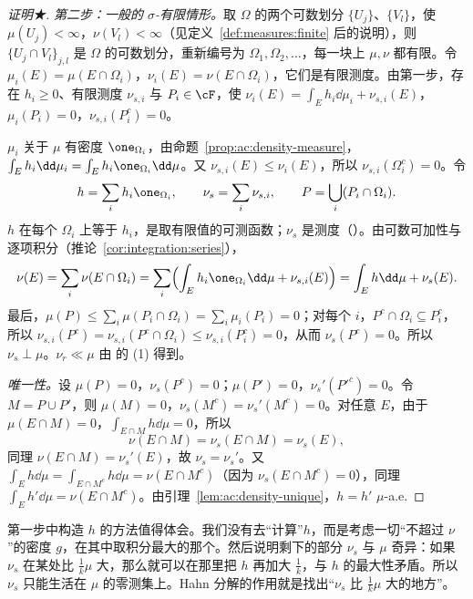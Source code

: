 \begin{proof}[证明★]
\emph{第二步：一般的 $\sigma$-有限情形。}取 $\Omega$ 的两个可数划分 $\{U_j\}$、$\{V_l\}$，使 $\mu(U_j)<\infty$，$\nu(V_l)<\infty$（见定义~\ref{def:measures:finite} 后的说明），则 $\{U_j\cap V_l\}_{j,l}$ 是 $\Omega$ 的可数划分，重新编号为 $\Omega_1,\Omega_2,\dots$，每一块上 $\mu,\nu$ 都有限。令 $\mu_i(E)=\mu(E\cap\Omega_i)$，$\nu_i(E)=\nu(E\cap\Omega_i)$，它们是有限测度。由第一步，存在 $h_i\geqslant0$、有限测度 $\nu_{s,i}$ 与 $P_i\in\cF$，使 $\nu_i(E)=\int_Eh_i\dd\mu_i+\nu_{s,i}(E)$，$\mu_i(P_i)=0$，$\nu_{s,i}(P_i^c)=0$。

$\mu_i$ 关于 $\mu$ 有密度 $\one_{\Omega_i}$，由命题~\ref{prop:ac:density-measure}，$\int_Eh_i\dd\mu_i=\int_Eh_i\one_{\Omega_i}\dd\mu$。又 $\nu_{s,i}(E)\leqslant\nu_i(E)$，所以 $\nu_{s,i}(\Omega_i^c)=0$。令
\[
h=\sum_ih_i\one_{\Omega_i},\qquad\nu_s=\sum_i\nu_{s,i},\qquad P=\bigcup_i(P_i\cap\Omega_i).
\]
$h$ 在每个 $\Omega_i$ 上等于 $h_i$，是取有限值的可测函数；$\nu_s$ 是测度（）。由可数可加性与逐项积分（推论~\ref{cor:integration:series}），
\[
\nu(E)=\sum_i\nu(E\cap\Omega_i)=\sum_i\Bigl(\int_Eh_i\one_{\Omega_i}\dd\mu+\nu_{s,i}(E)\Bigr)=\int_Eh\dd\mu+\nu_s(E).
\]
最后，$\mu(P)\leqslant\sum_i\mu(P_i\cap\Omega_i)=\sum_i\mu_i(P_i)=0$；对每个 $i$，$P^c\cap\Omega_i\subseteq P_i^c$，所以 $\nu_{s,i}(P^c)=\nu_{s,i}(P^c\cap\Omega_i)\leqslant\nu_{s,i}(P_i^c)=0$，从而 $\nu_s(P^c)=0$。所以 $\nu_s\perp\mu$。$\nu_r\ll\mu$ 由 的 (1) 得到。

\emph{唯一性。}设 $\mu(P)=0$，$\nu_s(P^c)=0$；$\mu(P')=0$，$\nu_s'(P'^c)=0$。令 $M=P\cup P'$，则 $\mu(M)=0$，$\nu_s(M^c)=\nu_s'(M^c)=0$。对任意 $E$，由于 $\mu(E\cap M)=0$，$\int_{E\cap M}h\dd\mu=0$，所以
\[
\nu(E\cap M)=\nu_s(E\cap M)=\nu_s(E),
\]
同理 $\nu(E\cap M)=\nu_s'(E)$，故 $\nu_s=\nu_s'$。又 $\int_Eh\dd\mu=\int_{E\cap M^c}h\dd\mu=\nu(E\cap M^c)$（因为 $\nu_s(E\cap M^c)=0$），同理 $\int_Eh'\dd\mu=\nu(E\cap M^c)$。由引理~\ref{lem:ac:density-unique}，$h=h'$ $\mu$-a.e.
\end{proof}

\begin{remark}
第一步中构造 $h$ 的方法值得体会。我们没有去“计算”$h$，而是考虑一切“不超过 $\nu$”的密度 $g$，在其中取积分最大的那个。然后说明剩下的部分 $\nu_s$ 与 $\mu$ 奇异：如果 $\nu_s$ 在某处比 $\frac1k\mu$ 大，那么就可以在那里把 $h$ 再加大 $\frac1k$，与 $h$ 的最大性矛盾。所以 $\nu_s$ 只能生活在 $\mu$ 的零测集上。Hahn 分解的作用就是找出“$\nu_s$ 比 $\frac1k\mu$ 大的地方”。
\end{remark}

